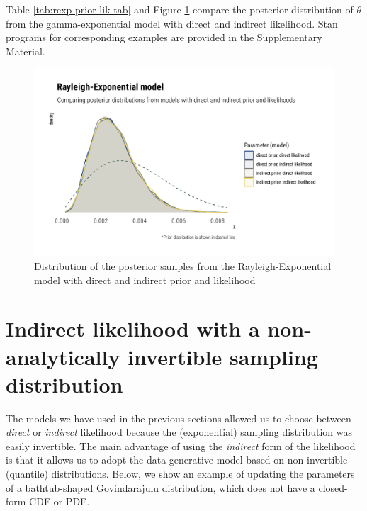 \documentclass[ba]{imsart}
\numberwithin{equation}{section}
\theoremstyle{plain}
\begin{document}
Table \ref{tab:rexp-prior-lik-tab} and Figure \ref{fig:rexp-prior-lik-graphs} compare the posterior distribution of \(\theta\) from the gamma-exponential model with direct and indirect likelihood. Stan programs for corresponding examples are provided in the Supplementary Material.

\begin{figure}

{\centering \includegraphics[width=0.8\linewidth]{BA-submission_files/figure-latex/rexp-prior-lik-graphs-1} 

}

\caption{Distribution of the posterior samples from the Rayleigh-Exponential model with direct and indirect prior and likelihood}\label{fig:rexp-prior-lik-graphs}
\end{figure}

\hypertarget{indirect-likelihood-with-a-non-analytically-invertible-sampling-distribution}{%
\section{Indirect likelihood with a non-analytically invertible sampling distribution}\label{indirect-likelihood-with-a-non-analytically-invertible-sampling-distribution}}

The models we have used in the previous sections allowed us to choose between \emph{direct} or \emph{indirect} likelihood because the (exponential) sampling distribution was easily invertible. The main advantage of using the \emph{indirect} form of the likelihood is that it allows us to adopt the data generative model based on non-invertible (quantile) distributions. Below, we show an example of updating the parameters of a bathtub-shaped Govindarajulu distribution, which does not have a closed-form CDF or PDF.
\end{document}

